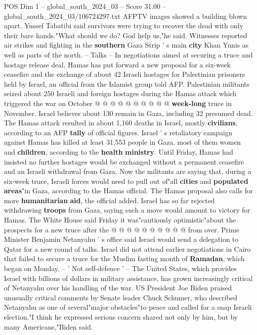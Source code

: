 \begin{textsample}{POS Dim 1 – global\_south\_2024\_03 – Score 31.00 – global\_south\_2024\_03/106724297.txt}
AFPTV images showed a building blown apart.
Yussef Tabatibi said survivors were trying to recover the dead with only their bare hands."What should we do?
God help us,"he said.
Witnesses reported air strikes and fighting in the \textbf{southern} Gaza Strip ' s main \textbf{city} Khan Yunis as well as parts of the north. -- Talks -- In negotiations aimed at securing a truce and hostage release deal, Hamas has put forward a new proposal for a six-week ceasefire and the exchange of about 42 Israeli hostages for Palestinian prisoners held by Israel, an official from the Islamist group told AFP.
Palestinian militants seized about 250 Israeli and foreign hostages during the Hamas attack which triggered the war on October @ @ @ @ @ @ @ @ @ @ \textbf{week-long} truce in November.
Israel believes about 130 remain in Gaza, including 32 presumed dead.
The Hamas attack resulted in about 1,160 deaths in Israel, mostly \textbf{civilians}, according to an AFP \textbf{tally} of official figures.
Israel ' s retaliatory campaign against Hamas has killed at least 31,553 people in Gaza, most of them women and \textbf{children}, according to the \textbf{health} \textbf{ministry}.
Until Friday, Hamas had insisted no further hostages would be exchanged without a permanent ceasefire and an Israeli withdrawal from Gaza.
Now the militants are saying that, during a six-week truce, Israeli forces would need to pull out of"all \textbf{cities} and \textbf{populated} \textbf{areas}"in Gaza, according to the Hamas official.
The Hamas proposal also calls for more \textbf{humanitarian} \textbf{aid}, the official added.
Israel has so far rejected withdrawing \textbf{troops} from Gaza, saying such a move would amount to victory for Hamas.
The White House said Friday it was"cautiously optimistic"about the prospects for a new truce after the @ @ @ @ @ @ @ @ @ @ from over.
Prime Minister Benjamin Netanyahu ' s office said Israel would send a delegation to Qatar for a new round of talks.
Israel did not attend earlier negotiations in Cairo that failed to secure a truce for the Muslim fasting month of \textbf{Ramadan}, which began on Monday. -- ' Not self-defence ' -- The United States, which provides Israel with billions of dollars in military assistance, has grown increasingly critical of Netanyahu over his handling of the war.
US President Joe Biden praised unusually critical comments by Senate leader Chuck Schumer, who described Netanyahu as one of several"major obstacles"to peace and called for a snap Israeli election."I think he expressed serious concern shared not only by him, but by many Americans,"Biden said.

\end{textsample}
